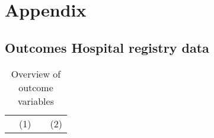 \documentclass{scrartcl} %
\begin{document}
\newpage
\section{Appendix}
\subsection{Outcomes Hospital registry data}


\begin{table}[h] %
\begin{threeparttable}
\centering %
\caption{Overview of outcome variables} %
\label{tab:outcomes_coding_main_chapters} 
\begin{tabular}{lrrr} %
\toprule %
        &\multicolumn{1}{c}{(1)}& &\multicolumn{1}{c}{(2)}\\


\end{tabular}
\end{threeparttable}
\end{table}
\end{document}
